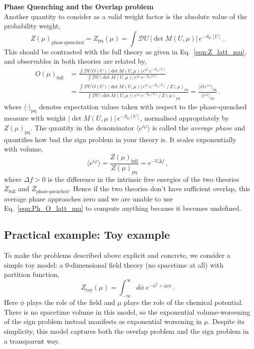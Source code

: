 \documentclass[11pt]{article}
\theoremstyle{definition}
\begin{document}
\noindent\textbf{Phase Quenching and the Overlap problem}\\
Another quantity to consider as a valid weight factor is the absolute value of the probability weight,
\begin{equation}\label{eqn:Ph_Z_latt_mu}
    Z(\mu)_{\mathrm{phase \, quenched}} = Z_{\mathrm{pq}}(\mu) = \int \mathcal{D}U \, | \det M(U,\mu) | \, e^{-S_G[U]} \,.
\end{equation}
This should be contrasted with the full theory as given in Eq.~\ref{eqn:Z_latt_mu}, and observables in both theories are related by,
\begin{align}\label{eqn:Ph_O_latt_mu}
    O(\mu)_{\mathrm{full}} &= \frac{\int \mathcal{D}U \, O(U)\, |\det M(U,\mu)|\, e^{i \varphi}\, e^{-S_G[U]}}{\int \mathcal{D}U \, |\det M(U,\mu)|\, e^{i \varphi}\, e^{-S_G[U]}} \nonumber \\[6pt]
    &= \frac{\int \mathcal{D}U \, O(U)\, |\det M(U,\mu)|\, e^{i\varphi}\, e^{-S_G[U]} \,/\, Z(\mu)_{\mathrm{pq}}}{\int \mathcal{D}U \, |\det M(U,\mu)|\, e^{i\varphi}\, e^{-S_G[U]} \,/\, Z(\mu)_{\mathrm{pq}}} = \frac{\langle O \, e^{i \varphi} \rangle_{\mathrm{pq}}}{\langle e^{i \varphi} \rangle_{\mathrm{pq}}} \,.
\end{align}
where $\langle \cdot \rangle_{\mathrm{pq}}$ denotes expectation values taken with respect to the phase-quenched measure with weight $|\det M(U,\mu)|\,e^{-S_G[U]}$, normalised appropriately by $Z(\mu)_{\mathrm{pq}}$.
The quantity in the denominator $\langle e^{i \varphi} \rangle$ is called the \textit{average phase} and quantifies how bad the sign problem in your theory is. It scales exponentially with volume,
\begin{equation}\label{eqn:exp_vol_sign}
    \langle e^{i \varphi} \rangle = \frac{Z(\mu)_{\mathrm{full}}}{Z(\mu)_{\mathrm{pq}}} = e^{-V \Delta f} \,,
\end{equation}
where $\Delta f > 0$ is the difference in the intrinsic free energies of the two theories $Z_{\mathrm{full}}$ and $Z_{\mathrm{phase \, quenched}}$. Hence if the two theories don't have sufficient overlap, this average phase approaches zero and we are unable to use Eq.~\ref{eqn:Ph_O_latt_mu} to compute anything because it becomes undefined. \\
\subsection{Practical example: Toy example}
To make the problems described above explicit and concrete, we consider a simple toy model: a $0$-dimensional field theory (no spacetime at all) with partition function,
\begin{equation}
    Z_{\mathrm{toy}}(\mu) = \int_{-\infty}^{\infty} d\phi \; e^{-\phi^2 + i \mu \phi} \,.
\end{equation}
Here $\phi$ plays the role of the field and $\mu$ plays the role of the chemical potential. There is no spacetime volume in this model, so the exponential volume-worsening of the sign problem instead manifests as exponential worsening in $\mu$. Despite its simplicity, this model captures both the overlap problem and the sign problem in a transparent way.
\end{document}
